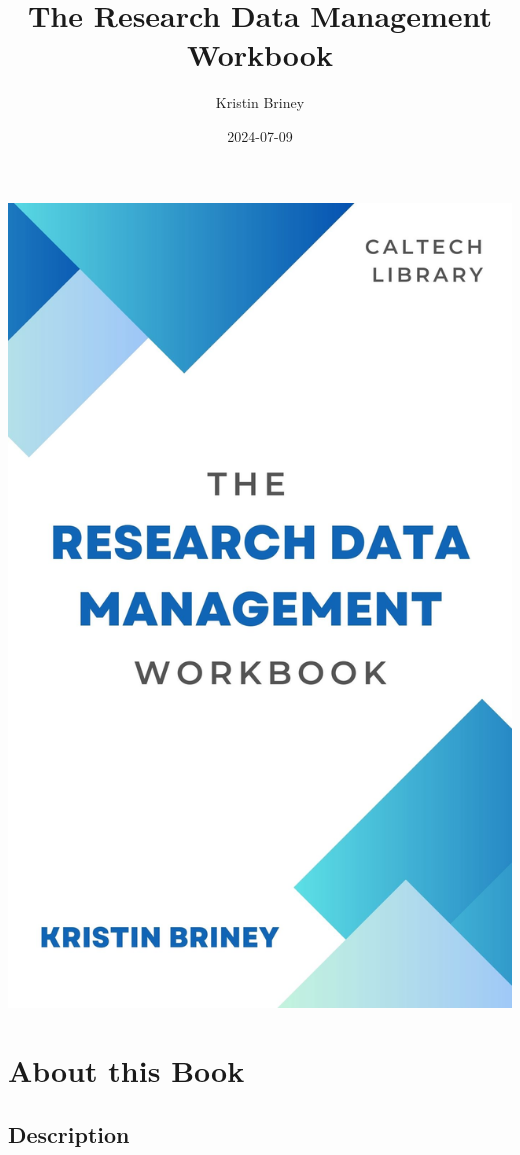 \documentclass[
]{book}
\title{The Research Data Management Workbook}
\author{Kristin Briney}
\date{2024-07-09}
\begin{document}
\maketitle

\includegraphics{./images/cover.jpg}

{
\setcounter{tocdepth}{1}
\tableofcontents
}
\hypertarget{about-this-book}{%
\chapter*{About this Book}\label{about-this-book}}

\hypertarget{description}{%
\section*{Description}\label{description}}
\end{document}
